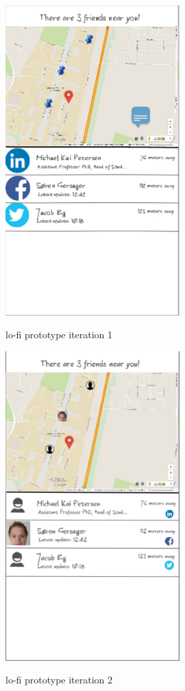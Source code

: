 \documentclass[runningheads,a4paper]{llncs}
\begin{document}
\begin{figure}
\centering
\caption{lo-fi prototype iteration 1}
\includegraphics[width=0.6\textwidth]{figures/lo-fi-4}
\label{fig:lo-fi-fixed-panel-simple-marker}
\end{figure}

\begin{figure}
\centering
\caption{lo-fi prototype iteration 2}
\includegraphics[width=0.6\textwidth]{figures/lo-fi-3}
\label{fig:lo-fi-fixed-panel}
\end{figure}
\end{document}
